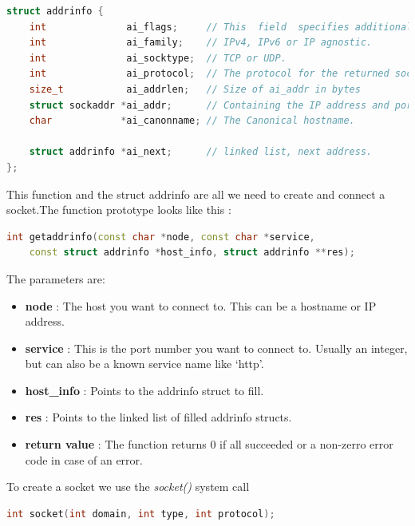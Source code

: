 \documentclass{article}
\begin{document}
				\begin{lstlisting}[language=C++, caption={The structure ``addrinfo''}]
struct addrinfo {
    int              ai_flags;     // This  field  specifies additional options.
    int              ai_family;    // IPv4, IPv6 or IP agnostic.
    int              ai_socktype;  // TCP or UDP.
    int              ai_protocol;  // The protocol for the returned socket addresses.
    size_t           ai_addrlen;   // Size of ai_addr in bytes
    struct sockaddr *ai_addr;      // Containing the IP address and port.
    char            *ai_canonname; // The Canonical hostname.

    struct addrinfo *ai_next;      // linked list, next address.
};
				\end{lstlisting}

				This function and the struct addrinfo are all we need to create and connect a socket.The function prototype looks like this : 

				\begin{lstlisting}[language=C++, caption={getaddrinfo() function}]
int getaddrinfo(const char *node, const char *service,
	const struct addrinfo *host_info, struct addrinfo **res); 
				\end{lstlisting}

				The parameters are:

				\begin{itemize}
					\item \textbf{node} : The host you want to connect to. This can be a hostname or IP address. 
					\item \textbf{service} : This is the port number you want to connect to. Usually an integer, but can also be a known service name like `http'. 					
					\item \textbf{host\_info} : Points to the addrinfo struct to fill. 					
					\item \textbf{res} : Points to the linked list of filled addrinfo structs. 
					\item \textbf{return value} : The function returns 0 if all succeeded or a non-zerro error code in case of an error.  
				\end{itemize}
				
				To create a socket we use the \textit{socket()} system call 

				\begin{lstlisting}[language=C++, caption={getaddrinfo() function}]
int socket(int domain, int type, int protocol); 
				\end{lstlisting} 	
\end{document}

